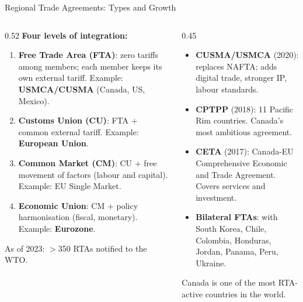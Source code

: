 \documentclass[aspectratio=169]{beamer}
\begin{document}
\begin{frame}{Regional Trade Agreements: Types and Growth}
\begin{columns}
\begin{column}{0.52\textwidth}
\textbf{Four levels of integration:}
\begin{enumerate}
  \item \textbf{Free Trade Area (FTA)}: zero tariffs among members; each member keeps its own external tariff. Example: \textbf{USMCA/CUSMA} (Canada, US, Mexico).
  \item \textbf{Customs Union (CU)}: FTA + common external tariff. Example: \textbf{European Union}.
  \item \textbf{Common Market (CM)}: CU + free movement of factors (labour and capital). Example: EU Single Market.
  \item \textbf{Economic Union}: CM + policy harmonisation (fiscal, monetary). Example: \textbf{Eurozone}.
\end{enumerate}
\vspace{0.2em}
As of 2023: $>$350 RTAs notified to the WTO.
\end{column}
\begin{column}{0.45\textwidth}
\begin{canadex}
  \begin{itemize}\small
    \item \textbf{CUSMA/USMCA} (2020): replaces NAFTA; adds digital trade, stronger IP, labour standards.
    \item \textbf{CPTPP} (2018): 11 Pacific Rim countries. Canada's most ambitious agreement.
    \item \textbf{CETA} (2017): Canada-EU Comprehensive Economic and Trade Agreement. Covers services and investment.
    \item \textbf{Bilateral FTAs}: with South Korea, Chile, Colombia, Honduras, Jordan, Panama, Peru, Ukraine.
  \end{itemize}
  Canada is one of the most RTA-active countries in the world.
\end{canadex}
\end{column}
\end{columns}
\end{frame}
\end{document}
